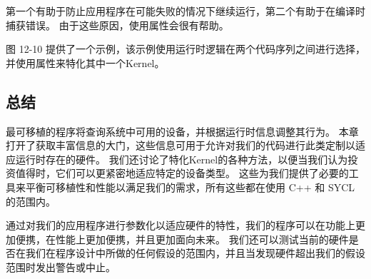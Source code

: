 第一个有助于防止应用程序在可能失败的情况下继续运行，第二个有助于在编译时捕获错误。 
由于这些原因，使用属性会很有帮助。

图 12-10 提供了一个示例，该示例使用运行时逻辑在两个代码序列之间进行选择，并使用属性来特化其中一个Kernel。

\subsection{总结}
最可移植的程序将查询系统中可用的设备，并根据运行时信息调整其行为。 
本章打开了获取丰富信息的大门，这些信息可用于允许对我们的代码进行此类定制以适应运行时存在的硬件。 
我们还讨论了特化Kernel的各种方法，以便当我们认为投资值得时，它们可以更紧密地适应特定的设备类型。 
这些为我们提供了必要的工具来平衡可移植性和性能以满足我们的需求，所有这些都在使用 C++ 和 SYCL 的范围内。

通过对我们的应用程序进行参数化以适应硬件的特性，我们的程序可以在功能上更加便携，在性能上更加便携，并且更加面向未来。 
我们还可以测试当前的硬件是否在我们在程序设计中所做的任何假设的范围内，并且当发现硬件超出我们的假设范围时发出警告或中止。